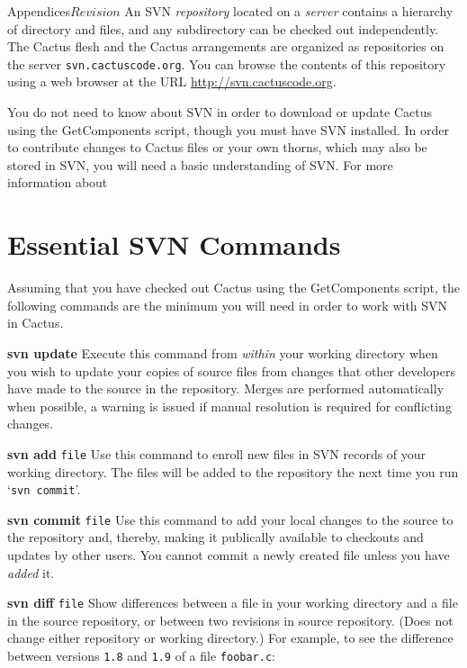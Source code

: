 \begin{cactuspart}{Appendices}{}{$Revision$}
An SVN \textit{repository} located on a \textit{server} contains a
hierarchy of directory and files, and any subdirectory can be checked
out independently.  The Cactus flesh and the Cactus arrangements are
organized as repositories on the server {\tt svn.cactuscode.org}.  You
can browse the contents of this repository using a web browser at the
URL \url{http://svn.cactuscode.org}.

You do not need to know about SVN in order to download or update
Cactus using the GetComponents script, though you must have SVN
installed.  In order to contribute changes to Cactus files or your own
thorns, which may also be stored in SVN, you will need a basic
understanding of SVN.  For more information about 

\section{Essential SVN Commands}

Assuming that you have checked out Cactus using the GetComponents
script, the following commands are the minimum you will need in order
to work with SVN in Cactus.

\begin{Lentry}

\item[{\bf svn update}]
Execute  this  command  from  \emph{within}  your  working
directory  when  you  wish  to  update your
copies of source  files  from  changes  that  other
developers have made to the source in the repository.
Merges are performed automatically when possible, a warning is issued
if manual  resolution  is  required  for conflicting  changes. 

\item[{\bf svn add} {\tt file}]
Use this command to enroll new files in SVN records
of your working directory.  The files will be added
to the  repository  the  next  time  you  run  `{\tt svn
commit}'.

\item[{\bf svn commit} {\tt file}]
Use this command to add your local changes to the source to
the repository and, thereby, making it publically available to
checkouts and updates by other users. You cannot commit a
newly created file unless you have \emph{added} it.

\item[{\bf svn diff} {\tt file}]
Show differences between a file in your working directory
and  a file in the source repository, or between two revisions in
source repository.  (Does not change either repository or working
directory.) For example, to see the difference between versions
{\tt 1.8} and {\tt 1.9} of a file {\tt foobar.c}:


\end{Lentry}
\end{cactuspart}
